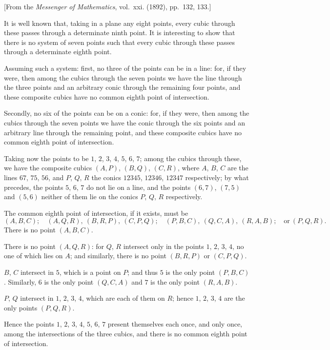 \documentclass[11pt,a4paper]{book}
\begin{document}
{{{[From the \textit{Messenger of Mathematics}, vol.~xxi. (1892), pp.~132, 133.]

\bigskip

It is well known that, taking in a plane any eight points, every cubic through
these passes through a determinate ninth point. It is interesting to show that there
is no system of seven points such that every cubic through these passes through a
determinate eighth point.

Assuming such a system: first, no three of the points can be in a line: for, if
they were, then among the cubics through the seven points we have the line
through the three points and an arbitrary conic through the remaining four points,
and these composite cubics have no common eighth point of intersection.

Secondly, no six of the points can be on a conic: for, if they were, then among
the cubics through the seven points we have the conic through the six points and
an arbitrary line through the remaining point, and these composite cubics have no
common eighth point of intersection.

Taking now the points to be $1$, $2$, $3$, $4$, $5$, $6$, $7$; among the cubics through
these, we have the composite cubics $(A, P)$, $(B, Q)$, $(C, R)$, where $A$, $B$, $C$ are the
lines $67$, $75$, $56$, and $P$, $Q$, $R$ the conics $12345$, $12346$, $12347$ respectively; by what
precedes, the points $5$, $6$, $7$ do not lie on a line, and the points $(6, 7)$, $(7, 5)$ and
$(5, 6)$ neither of them lie on the conics $P$, $Q$, $R$ respectively.

The common eighth point of intersection, if it exists, must be
\[
(A, B, C);\quad (A, Q, R),\ (B, R, P),\ (C, P, Q);\quad
(P, B, C),\ (Q, C, A),\ (R, A, B);\quad \text{or}\ (P, Q, R).
\]
There is no point $(A, B, C)$.

There is no point $(A, Q, R)$: for $Q$, $R$ intersect only in the points $1$, $2$, $3$, $4$,
no one of which lies on $A$; and similarly, there is no point $(B, R, P)$ or $(C, P, Q)$.

$B$, $C$ intersect in $5$, which is a point on $P$; and thus $5$ is the only point
$(P, B, C)$. Similarly, $6$ is the only point $(Q, C, A)$ and $7$ is the only point $(R, A, B)$.

$P$, $Q$ intersect in $1$, $2$, $3$, $4$, which are each of them on $R$; hence $1$, $2$, $3$, $4$
are the only points $(P, Q, R)$.

Hence the points $1$, $2$, $3$, $4$, $5$, $6$, $7$ present themselves each once, and only
once, among the intersections of the three cubics, and there is no common eighth point
of intersection.



}}}
\end{document}
